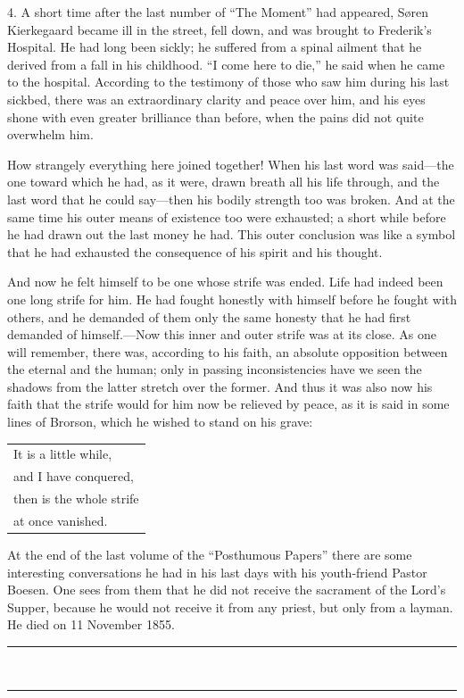 \documentclass[12pt,a4paper]{book}
\newcommand{\opage}[1]{\marginnote{\footnotesize\textit{[#1]}}}
\begin{document}
4. A short time after the last number of ``The Moment'' had appeared,
Søren Kierkegaard became ill in the street, fell down, and was brought to
Frederik's Hospital. He had long been sickly; he suffered from a spinal
ailment that he derived from a fall in his childhood. ``I come here to
die,'' he said when he came to the hospital. According to the testimony
of those who saw him during his last sickbed, there was an extraordinary
clarity and peace over him, and his eyes shone with even
\opage{149}greater brilliance than before, when the pains did not quite
overwhelm him.

How strangely everything here joined together! When his last word was
said---the one toward which he had, as it were, drawn breath all his
life through, and the last word that he could say---then his bodily
strength too was broken. And at the same time his outer means of
existence too were exhausted; a short while before he had drawn out the
last money he had. This outer conclusion was like a symbol that he had
exhausted the consequence of his spirit and his thought.

And now he felt himself to be one whose strife was ended. Life had indeed
been one long strife for him. He had fought honestly with himself before
he fought with others, and he demanded of them only the same honesty that
he had first demanded of himself.---Now this inner and outer strife was
at its close. As one will remember, there was, according to his faith, an
absolute opposition between the eternal and the human; only in passing
inconsistencies have we seen the shadows from the latter stretch over the
former. And thus it was also now his faith that the strife would for him
now be relieved by peace, as it is said in some lines of Brorson, which
he wished to stand on his grave:
\begin{center}\small\begin{tabular}{@{}l@{}}
It is a little while,\\
and I have conquered,\\
then is the whole strife\\
at once vanished.
\end{tabular}\end{center}

At the end of the last volume of the ``Posthumous Papers'' there are some
interesting conversations he had in his last days with his youth-friend
Pastor Boesen. One sees from them that he did not receive the sacrament
of the Lord's Supper, because he would not receive it from any priest,
but only from a layman. He died on 11 November 1855.
\begin{center}\rule{2cm}{0.4pt}\\[-8pt]\rule{2cm}{0.4pt}\end{center}
\clearpage
\end{document}

